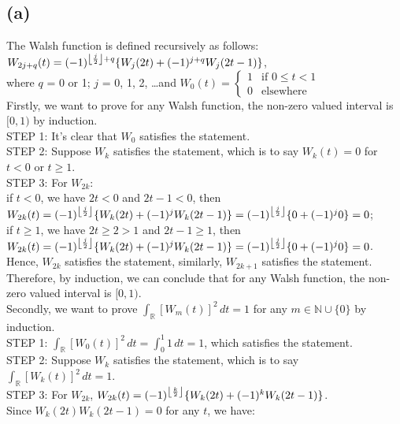 \documentclass[12pt]{article}
\DeclarePairedDelimiter\floor{\lfloor}{\rfloor}
\begin{document}
    \subsection*{(a)}
    The Walsh function is defined recursively as follows:\\
    \hspace*{1cm} $W_{2j+q}(t) = (-1)^{\floor*{\frac{j}{2}}+q} \{W_j(2t)+(-1)^{j+q}W_j(2t-1)\}$,\\
    where $q$ = 0 or 1; $j$ = 0, 1, 2, \dots and $W_0(t) = \begin{cases}
        1 & \text{if $0 \leq t < 1$}\\
        0 & \text{elsewhere}
    \end{cases}$\\
    Firstly, we want to prove for any Walsh function, the non-zero valued interval is $[0, 1)$ by induction.\\
    STEP 1: It's clear that $W_0$ satisfies the statement.\\
    STEP 2: Suppose $W_k$ satisfies the statement, which is to say $W_k(t) = 0$ for $t < 0$ or $t \geq 1$.\\
    STEP 3: For $W_{2k}$:\\
    if $t < 0$, we have $2t < 0$ and $2t-1 < 0$, then $W_{2k}(t) = (-1)^{\floor*{\frac{j}{2}}} \{W_k(2t)+(-1)^{j}W_k(2t-1)\} = (-1)^{\floor*{\frac{j}{2}}} \{0+(-1)^{j}0\} = 0$;\\
    if $t \geq 1$, we have $2t \geq 2 >1$ and $2t-1 \geq 1$, then $W_{2k}(t) = (-1)^{\floor*{\frac{j}{2}}} \{W_k(2t)+(-1)^{j}W_k(2t-1)\} = (-1)^{\floor*{\frac{j}{2}}} \{0+(-1)^{j}0\} = 0$.\\
    Hence, $W_{2k}$ satisfies the statement, similarly, $W_{2k+1}$ satisfies the statement.\\
    Therefore, by induction, we can conclude that for any Walsh function, the non-zero valued interval is $[0, 1)$.\\
    Secondly, we want to prove $\int_\mathbb{R} [W_{m}(t)]^2 \, dt = 1$ for any $m \in \mathbb{N} \cup \{0\}$ by induction.\\
    STEP 1: $\int_\mathbb{R} [W_{0}(t)]^2 \, dt = \int _0^1 1 \, dt = 1$, which satisfies the statement.\\
    STEP 2: Suppose $W_k$ satisfies the statement, which is to say $\int_\mathbb{R} [W_{k}(t)]^2 \, dt = 1$.\\
    STEP 3: For $W_{2k}$, $W_{2k}(t) = (-1)^{\floor*{\frac{k}{2}}} \{W_k(2t)+(-1)^{k}W_k(2t-1)\}$.\\
            Since $W_k(2t)W_k(2t-1)=0$ for any $t$, we have:
\end{document}
